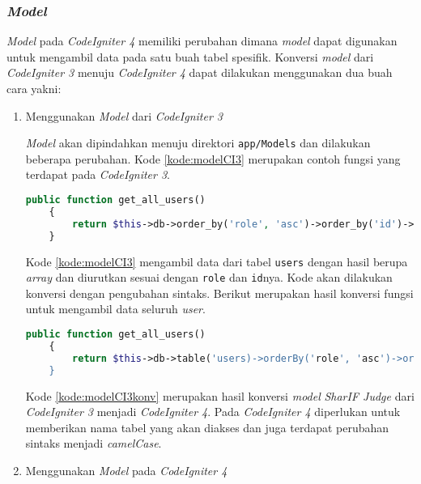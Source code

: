\subsubsection{\textit{Model}}
\textit{Model} pada \textit{CodeIgniter 4} memiliki perubahan dimana \textit{model} dapat digunakan untuk mengambil data pada satu buah tabel spesifik. Konversi \textit{model} dari \textit{CodeIgniter 3} menuju \textit{CodeIgniter 4} dapat dilakukan menggunakan dua buah cara yakni:
\begin{enumerate}
\item Menggunakan \textit{Model} dari \textit{CodeIgniter 3}

\textit{Model} akan dipindahkan menuju direktori \texttt{app/Models} dan dilakukan beberapa perubahan. Kode \ref{kode:modelCI3} merupakan contoh fungsi yang terdapat pada \textit{CodeIgniter 3}.
\begin{lstlisting}[language=PHP, caption=Contoh fungsi untuk mengambil data seluruh user pada \textit{CodeIgniter 3}, label=kode:modelCI3]
public function get_all_users()
	{
		return $this->db->order_by('role', 'asc')->order_by('id')->get('users')->result_array();
	}
\end{lstlisting}

Kode \ref{kode:modelCI3} mengambil data dari tabel \texttt{users} dengan hasil berupa \textit{array} dan diurutkan sesuai dengan \texttt{role} dan \texttt{id}nya. Kode akan dilakukan konversi dengan pengubahan sintaks. Berikut merupakan hasil konversi fungsi untuk mengambil data seluruh \textit{user}.
\begin{lstlisting}[language=PHP, caption=Hasil konversi fungsi untuk mengambil data seluruh user, label=kode:modelCI3konv]
public function get_all_users()
	{
		return $this->db->table('users)->orderBy('role', 'asc')->orderBy('id')->get()->getResultArray();
	}
\end{lstlisting}
Kode \ref{kode:modelCI3konv} merupakan hasil konversi \textit{model} \textit{SharIF Judge} dari \textit{CodeIgniter 3} menjadi \textit{CodeIgniter 4}. Pada \textit{CodeIgniter 4} diperlukan untuk memberikan nama tabel yang akan diakses dan juga terdapat perubahan sintaks menjadi \textit{camelCase}.

\item Menggunakan \textit{Model} pada \textit{CodeIgniter 4}


\end{enumerate}
